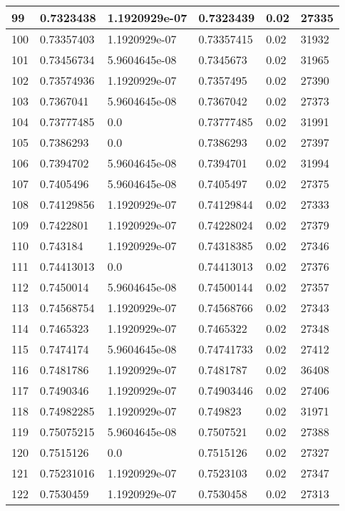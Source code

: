 \begin{longtable}{|l|l|l|l|l|l|}
99 & 0.7323438 & 1.1920929e-07 & 0.7323439 & 0.02 & 27335 \\ \hline 
100 & 0.73357403 & 1.1920929e-07 & 0.73357415 & 0.02 & 31932 \\ \hline 
101 & 0.73456734 & 5.9604645e-08 & 0.7345673 & 0.02 & 31965 \\ \hline 
102 & 0.73574936 & 1.1920929e-07 & 0.7357495 & 0.02 & 27390 \\ \hline 
103 & 0.7367041 & 5.9604645e-08 & 0.7367042 & 0.02 & 27373 \\ \hline 
104 & 0.73777485 & 0.0 & 0.73777485 & 0.02 & 31991 \\ \hline 
105 & 0.7386293 & 0.0 & 0.7386293 & 0.02 & 27397 \\ \hline 
106 & 0.7394702 & 5.9604645e-08 & 0.7394701 & 0.02 & 31994 \\ \hline 
107 & 0.7405496 & 5.9604645e-08 & 0.7405497 & 0.02 & 27375 \\ \hline 
108 & 0.74129856 & 1.1920929e-07 & 0.74129844 & 0.02 & 27333 \\ \hline 
109 & 0.7422801 & 1.1920929e-07 & 0.74228024 & 0.02 & 27379 \\ \hline 
110 & 0.743184 & 1.1920929e-07 & 0.74318385 & 0.02 & 27346 \\ \hline 
111 & 0.74413013 & 0.0 & 0.74413013 & 0.02 & 27376 \\ \hline 
112 & 0.7450014 & 5.9604645e-08 & 0.74500144 & 0.02 & 27357 \\ \hline 
113 & 0.74568754 & 1.1920929e-07 & 0.74568766 & 0.02 & 27343 \\ \hline 
114 & 0.7465323 & 1.1920929e-07 & 0.7465322 & 0.02 & 27348 \\ \hline 
115 & 0.7474174 & 5.9604645e-08 & 0.74741733 & 0.02 & 27412 \\ \hline 
116 & 0.7481786 & 1.1920929e-07 & 0.7481787 & 0.02 & 36408 \\ \hline 
117 & 0.7490346 & 1.1920929e-07 & 0.74903446 & 0.02 & 27406 \\ \hline 
118 & 0.74982285 & 1.1920929e-07 & 0.749823 & 0.02 & 31971 \\ \hline 
119 & 0.75075215 & 5.9604645e-08 & 0.7507521 & 0.02 & 27388 \\ \hline 
120 & 0.7515126 & 0.0 & 0.7515126 & 0.02 & 27327 \\ \hline 
121 & 0.75231016 & 1.1920929e-07 & 0.7523103 & 0.02 & 27347 \\ \hline 
122 & 0.7530459 & 1.1920929e-07 & 0.7530458 & 0.02 & 27313 \\ \hline 

\end{longtable}

